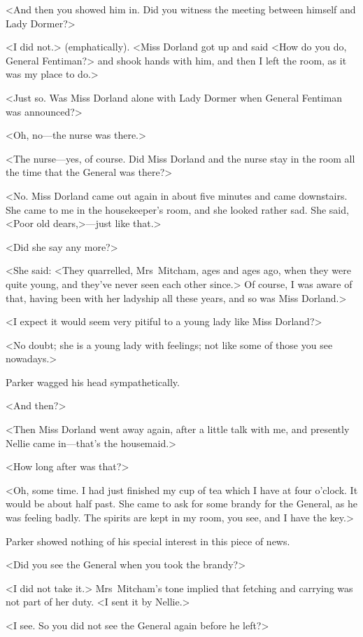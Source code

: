 <And then you showed him in. Did you witness the meeting between himself and Lady Dormer?>

<I did not.> (emphatically). <Miss Dorland got up and said <How do you do, General Fentiman?> and shook hands with him, and then I left the room, as it was my place to do.>

<Just so. Was Miss Dorland alone with Lady Dormer when General Fentiman was announced?>

<Oh, no—the nurse was there.>

<The nurse—yes, of course. Did Miss Dorland and the nurse stay in the room all the time that the General was there?>

<No. Miss Dorland came out again in about five minutes and came downstairs. She came to me in the housekeeper's room, and she looked rather sad. She said, <Poor old dears,>—just like that.>

<Did she say any more?>

<She said: <They quarrelled, Mrs~Mitcham, ages and ages ago, when they were quite young, and they've never seen each other since.> Of course, I was aware of that, having been with her ladyship all these years, and so was Miss Dorland.>

<I expect it would seem very pitiful to a young lady like Miss Dorland?>

<No doubt; she is a young lady with feelings; not like some of those you see nowadays.>

Parker wagged his head sympathetically.

<And then?>

<Then Miss Dorland went away again, after a little talk with me, and presently Nellie came in—that's the housemaid.>

<How long after was that?>

<Oh, some time. I had just finished my cup of tea which I have at four o'clock. It would be about half past. She came to ask for some brandy for the General, as he was feeling badly. The spirits are kept in my room, you see, and I have the key.>

Parker showed nothing of his special interest in this piece of news.

<Did you see the General when you took the brandy?>

<I did not take it.> Mrs~Mitcham's tone implied that fetching and carrying was not part of her duty. <I sent it by Nellie.>

<I see. So you did not see the General again before he left?>

